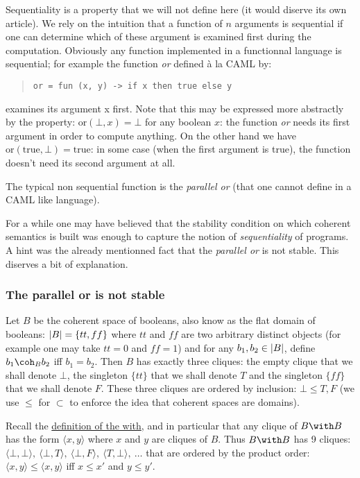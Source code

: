 Sequentiality is a property that we will not define here (it would
diserve its own article). We rely on the intuition that a function of
\(n\) arguments is sequential if one can determine which of these
argument is examined first during the computation. Obviously any
function implemented in a functionnal language is sequential; for
example the function \emph{or} defined à la CAML by:
\begin{quotation}
\texttt{or\ =\ fun\ (x,\ y)\ -\textgreater{}\ if\ x\ then\ true\ else\ y}
\end{quotation}
examines its argument x first. Note that this may be expressed more
abstractly by the property: \(\mathrm{or}(\bot, x) = \bot\) for any
boolean \(x\): the function \emph{or} needs its first argument in order
to compute anything. On the other hand we have
\(\mathrm{or}(\mathrm{true}, \bot) = \mathrm{true}\): in some case (when
the first argument is true), the function doesn't need its second
argument at all.

The typical non sequential function is the \emph{parallel or} (that one
cannot define in a CAML like language).

For a while one may have believed that the stability condition on which
coherent semantics is built was enough to capture the notion of
\emph{sequentiality} of programs. A hint was the already mentionned fact
that the \emph{parallel or} is not stable. This diserves a bit of
explanation.

\subsubsection{The parallel or is not stable}\label{the-parallel-or-is-not-stable}

Let \(B\) be the coherent space of booleans, also know as the flat
domain of booleans: \(\left|B\right| = \{tt, ff\}\) where \(tt\) and \(ff\) are
two arbitrary distinct objects (for example one may take \(tt = 0\) and
\(ff = 1\)) and for any \(b_1, b_2\in \left|B\right|\), define \(b_1\coh_B b_2\)
iff \(b_1 = b_2\). Then \(B\) has exactly three cliques: the empty
clique that we shall denote \(\bot\), the singleton \(\{tt\}\) that we
shall denote \(T\) and the singleton \(\{ff\}\) that we shall denote
\(F\). These three cliques are ordered by inclusion: \(\bot \leq T, F\)
(we use \(\leq\) for \(\subset\) to enforce the idea that coherent
spaces are domains).

Recall the \hyperref[cartesian-product]{definition of the
with}, and in particular that any clique of \(B\with B\) has the form
\(\langle x, y\rangle\) where \(x\) and \(y\) are cliques of \(B\). Thus
\(B\with B\) has 9 cliques:
\(\langle\bot,\bot\rangle,\ \langle\bot, T\rangle,\ \langle\bot, F\rangle,\ \langle T,\bot\rangle,\ \dots\)
that are ordered by the product order:
\(\langle x,y\rangle\leq \langle x,y\rangle\) iff \(x\leq x'\) and
\(y\leq y'\).

